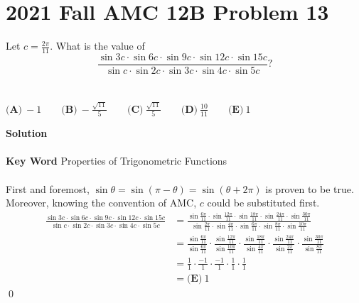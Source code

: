 \documentclass{article}
\newenvironment{solution}{\begin{trivlist}\item[]{\bf Solution}}{\qed \end{trivlist}}
\begin{document}
\section*{2021 Fall AMC 12B Problem 13}
Let $c = \frac{2\pi}{11}.$ What is the value of
\[
\frac{\sin 3c \cdot \sin 6c \cdot \sin 9c \cdot \sin 12c \cdot \sin 15c}{\sin c \cdot \sin 2c \cdot \sin 3c \cdot \sin 4c \cdot \sin 5c}?
\]
\\\\
$\textbf{(A)}\ {-}1 \qquad\textbf{(B)}\ {-}\frac{\sqrt{11}}{5} \qquad\textbf{(C)}\ \frac{\sqrt{11}}{5} \qquad\textbf{(D)}\ \frac{10}{11} \qquad\textbf{(E)}\ 1$
\begin{solution}
\\\\
\textbf{Key Word} Properties of Trigonometric Functions
\\\\
First and foremost, $\sin\theta = \sin(\pi - \theta) = \sin(\theta + 2\pi)$ is proven to be true. Moreover, knowing the convention of AMC, $c$ could be substituted first.
\begin{align*}
\frac{\sin3c \cdot \sin6c \cdot \sin9c \cdot \sin12c \cdot \sin15c}{\sin{c} \cdot \sin2c \cdot \sin3c \cdot \sin4c \cdot \sin5c}
&= \frac{\sin\frac{6\pi}{11} \cdot \sin\frac{12\pi}{11} \cdot \sin\frac{18\pi}{11} \cdot \sin\frac{24\pi}{11} \cdot \sin\frac{30\pi}{11}}{\sin\frac{2\pi}{11} \cdot \sin\frac{4\pi}{11} \cdot \sin\frac{6\pi}{11} \cdot \sin\frac{8\pi}{11} \cdot \sin\frac{10\pi}{11}} \\[0.8em]
&= \frac{\sin\frac{6\pi}{11}}{\sin\frac{6\pi}{11}} \cdot \frac{\sin\frac{12\pi}{11}}{\sin\frac{10\pi}{11}} \cdot \frac{\sin\frac{18\pi}{11}}{\sin\frac{4\pi}{11}} \cdot \frac{\sin\frac{24\pi}{11}}{\sin\frac{2\pi}{11}} \cdot \frac{\sin\frac{30\pi}{11}}{\sin\frac{8\pi}{11}} \\[0.8em]
&= \frac{1}{1} \cdot \frac{-1}{1} \cdot \frac{-1}{1} \cdot \frac{1}{1} \cdot \frac{1}{1} \\[0.8em]
&= \boxed{\textbf{(E)}\ 1}
\end{align*}
\end{solution}
\end{document}

